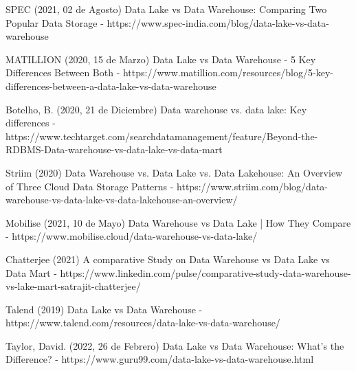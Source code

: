 \documentclass{article}
\begin{document}
\begin{thebibliography}{}

    SPEC (2021, 02 de Agosto) Data Lake vs Data Warehouse: Comparing Two Popular Data Storage - https://www.spec-india.com/blog/data-lake-vs-data-warehouse
    
    MATILLION (2020, 15 de Marzo) Data Lake vs Data Warehouse - 5 Key Differences Between Both - https://www.matillion.com/resources/blog/5-key-differences-between-a-data-lake-vs-data-warehouse
   
    Botelho, B. (2020, 21 de Diciembre) Data warehouse vs. data lake: Key differences - https://www.techtarget.com/searchdatamanagement/feature/Beyond-the-RDBMS-Data-warehouse-vs-data-lake-vs-data-mart
  
    Striim (2020) Data Warehouse vs. Data Lake vs. Data Lakehouse: An Overview of Three Cloud Data Storage Patterns - https://www.striim.com/blog/data-warehouse-vs-data-lake-vs-data-lakehouse-an-overview/
    
    Mobilise (2021, 10 de Mayo) Data Warehouse vs Data Lake | How They Compare - https://www.mobilise.cloud/data-warehouse-vs-data-lake/
   
   Chatterjee (2021) A comparative Study on Data Warehouse vs Data Lake vs Data Mart - https://www.linkedin.com/pulse/comparative-study-data-warehouse-vs-lake-mart-satrajit-chatterjee/
   
   Talend (2019) Data Lake vs Data Warehouse - https://www.talend.com/resources/data-lake-vs-data-warehouse/
    
    Taylor, David. (2022, 26 de Febrero) Data Lake vs Data Warehouse: What’s the Difference? - https://www.guru99.com/data-lake-vs-data-warehouse.html

    

 
    \end{thebibliography}
    
    
\end{document}
